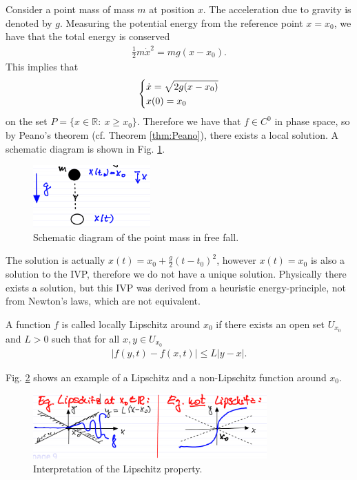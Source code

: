\begin{ex}
	Consider a point mass of mass $m$ at position $x$. The acceleration due to gravity is denoted by $g$. Measuring the potential energy from the reference point $x=x_0$, we have that the total energy is conserved
	\begin{align}
		\frac{1}{2} m \dot{x}^2 = mg(x-x_0).
	\end{align}
This implies that
\begin{align}
	\begin{dcases}
		\dot{x} = \sqrt{2g(x-x_0)} \\
		x(0) = x_0
	\end{dcases}
\end{align}
on the set $P = \{ x \in \mathbb{R}:\ x \geq x_0\}$. Therefore we have that $f\in C^0$ in phase space, so by Peano's theorem (cf. Theorem \ref{thm:Peano}), there exists a local solution. A schematic diagram is shown in Fig. \ref{fig:chap1:1}. 
	\begin{figure}[H]
		\label{fig:chap1:1}
		\centering
		\includegraphics[width=0.4\textwidth]{figures/ch1/1freefall.png}
		\caption{Schematic diagram of the point mass in free fall.}
	\end{figure}
	The solution is actually $x(t) = x_0 + \frac{g}{2}(t-t_0)^2$, however $x(t) = x_0$ is also a solution to the IVP, therefore we do not have a unique solution. Physically there exists a solution, but this IVP was derived from a heuristic energy-principle, not from Newton's laws, which are not equivalent.
\end{ex}
\begin{definition}
A function $f$ is called locally Lipschitz around $x_0$ if there exists an open set $U_{x_0}$ and $L>0$ such that for all $x,y \in U_{x_0}$
\begin{align}
	\boxed{\left| f(y,t) - f(x,t)\right| \leq L |y - x|.}
\end{align}
\end{definition}

\begin{ex}
	Fig. \ref{fig:chap1:2} shows an example of a Lipschitz and a non-Lipschitz function around $x_0$.
	\begin{figure}[h]
		\label{fig:chap1:2}
		\centering
		\includegraphics[width=0.8\textwidth]{figures/ch1/2lipschitz.png}
		\caption{Interpretation of the Lipschitz property.}
	\end{figure}
\end{ex}

